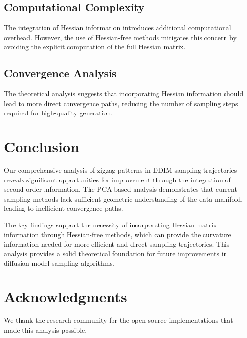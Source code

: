 \documentclass[11pt]{article}
\begin{document}
\subsection{Computational Complexity}
The integration of Hessian information introduces additional computational overhead. However, the use of Hessian-free methods mitigates this concern by avoiding the explicit computation of the full Hessian matrix.

\subsection{Convergence Analysis}
The theoretical analysis suggests that incorporating Hessian information should lead to more direct convergence paths, reducing the number of sampling steps required for high-quality generation.

\section{Conclusion}

Our comprehensive analysis of zigzag patterns in DDIM sampling trajectories reveals significant opportunities for improvement through the integration of second-order information. The PCA-based analysis demonstrates that current sampling methods lack sufficient geometric understanding of the data manifold, leading to inefficient convergence paths.

The key findings support the necessity of incorporating Hessian matrix information through Hessian-free methods, which can provide the curvature information needed for more efficient and direct sampling trajectories. This analysis provides a solid theoretical foundation for future improvements in diffusion model sampling algorithms.

\section*{Acknowledgments}
We thank the research community for the open-source implementations that made this analysis possible.
\end{document}
